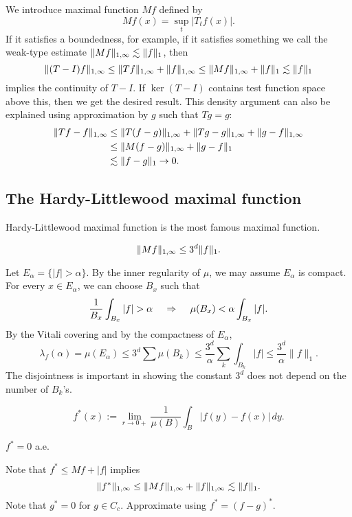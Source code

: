 \documentclass{../crs}
\begin{document}
We introduce maximal function $Mf$ defined by
\[Mf(x)=\sup_t|T_tf(x)|.\]
If it satisfies a boundedness, for example, if it satisfies something we call the weak-type estimate $\|Mf\|_{1,\infty}\lesssim\|f\|_1$, then
\[\|(T-I)f\|_{1,\infty}\le\|Tf\|_{1,\infty}+\|f\|_{1,\infty}\le\|Mf\|_{1,\infty}+\|f\|_1\lesssim\|f\|_1\]
implies the continuity of $T-I$.
If $\ker(T-I)$ contains test function space above this, then we get the desired result.
This density argument can also be explained using approximation by $g$ such that $Tg=g$:
\begin{align*}
\|Tf-f\|_{1,\oo}&\le \|T(f-g)\|_{1,\oo}+\|Tg-g\|_{1,\oo}+\|g-f\|_{1,\oo}\\&\le \|M(f-g)\|_{1,\oo}+\|g-f\|_1\\&\lesssim \|f-g\|_1\to0.
\end{align*}



\subsection{The Hardy-Littlewood maximal function}
Hardy-Littlewood maximal function is the most famous maximal function.

\begin{thm}
\[\|Mf\|_{1,\infty}\le 3^d\|f\|_1.\]
\end{thm}
\begin{pf}
Let $E_\alpha=\{|f|>\alpha\}$.
By the inner regularity of $\mu$, we may assume $E_\alpha$ is compact.
For every $x\in E_\alpha$, we can choose $B_x$ such that
\[\frac1{B_x}\int_{B_x}|f|>\alpha\quad\impl\quad\mu(B_x)<\alpha\int_{B_x}|f|.\]
By the Vitali covering and by the compactness of $E_\alpha$,
\[\lambda_f(\alpha)=\mu(E_\alpha)\le3^d\sum\mu(B_k)\le\frac{3^d}\alpha\sum_k\int_{B_k}|f|\le\frac{3^d}\alpha\|f\|_1.\]
The disjointness is important in showing the constant $3^d$ does not depend on the number of $B_k$'s.
\end{pf}

\begin{defn}
\[f^*(x):=\lim_{r\to0+}\frac1{\mu(B)}\int_B|f(y)-f(x)|\,dy.\]
\end{defn}
\begin{thm}
$f^*=0$ a.e.
\end{thm}
\begin{pf}
Note that $f^*\le Mf+|f|$ implies
\[\|f^*\|_{1,\infty}\le\|Mf\|_{1,\infty}+\|f\|_{1,\infty}\lesssim\|f\|_1.\]
Note that $g^*=0$ for $g\in C_c$.
Approximate using $f^*=(f-g)^*$.
\end{pf}
\end{document}

